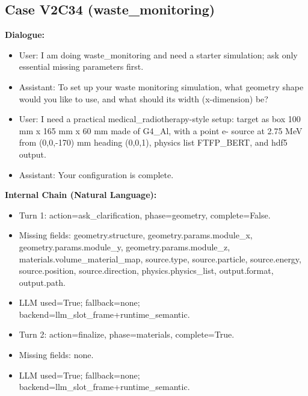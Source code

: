 \documentclass[11pt]{ctexart}
\begin{document}
\subsection{Case V2C34 (waste\_monitoring)}
\textbf{Dialogue:}
\begin{itemize}
\item User: I am doing waste\_monitoring and need a starter simulation; ask only essential missing parameters first.
\item Assistant: To set up your waste monitoring simulation, what geometry shape would you like to use, and what should its width (x-dimension) be?
\item User: I need a practical medical\_radiotherapy-style setup: target as box 100 mm x 165 mm x 60 mm made of G4\_Al, with a point e- source at 2.75 MeV from (0,0,-170) mm heading (0,0,1), physics list FTFP\_BERT, and hdf5 output.
\item Assistant: Your configuration is complete.
\end{itemize}
\textbf{Internal Chain (Natural Language):}
\begin{itemize}
\item Turn 1: action=ask\_clarification, phase=geometry, complete=False.
\item Missing fields: geometry.structure, geometry.params.module\_x, geometry.params.module\_y, geometry.params.module\_z, materials.volume\_material\_map, source.type, source.particle, source.energy, source.position, source.direction, physics.physics\_list, output.format, output.path.
\item LLM used=True; fallback=none; backend=llm\_slot\_frame+runtime\_semantic.
\item Turn 2: action=finalize, phase=materials, complete=True.
\item Missing fields: none.
\item LLM used=True; fallback=none; backend=llm\_slot\_frame+runtime\_semantic.
\end{itemize}
\end{document}

